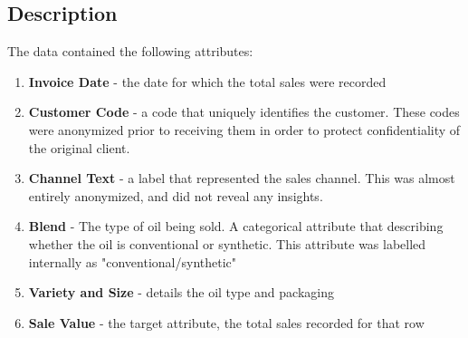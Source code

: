 \documentclass{article}
\begin{document}
    \subsection{Description}
        The data contained the following attributes:
        \begin{enumerate}
            \item \textbf{Invoice Date} - the date for which the total sales were recorded
            \item \textbf{Customer Code} - a code that uniquely identifies the customer. These codes
                were anonymized prior to receiving them in order to protect confidentiality
                of the original client.
            \item \textbf{Channel Text} - a label that represented the sales channel. This was almost
                entirely anonymized, and did not reveal any insights.
            \item \textbf{Blend} - The type of oil being sold. A categorical attribute that describing
                whether the oil is conventional or synthetic. This attribute was labelled internally
                as "conventional/synthetic"
            \item \textbf{Variety and Size} - details the oil type and packaging
            \item \textbf{Sale Value} - the target attribute, the total sales recorded for that row
        \end{enumerate}
\end{document}
